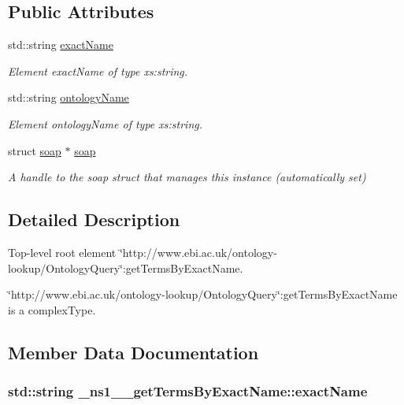 \subsection*{Public Attributes}
\begin{DoxyCompactItemize}
\item 
std::string \hyperlink{class__ns1____getTermsByExactName_aafe1da2d9016fdef9fd1265cf98af660}{exactName}
\begin{DoxyCompactList}\small\item\em Element exactName of type xs:string. \end{DoxyCompactList}\item 
std::string \hyperlink{class__ns1____getTermsByExactName_a18c7a192bfb3aed0166fee7d8bcfbf71}{ontologyName}
\begin{DoxyCompactList}\small\item\em Element ontologyName of type xs:string. \end{DoxyCompactList}\item 
\hypertarget{class__ns1____getTermsByExactName_ae1f8d6e6d8eef1294eac66b63184b45d}{
struct \hyperlink{class__ns1____getTermsByExactName_ae1f8d6e6d8eef1294eac66b63184b45d}{soap} $\ast$ \hyperlink{class__ns1____getTermsByExactName_ae1f8d6e6d8eef1294eac66b63184b45d}{soap}}
\label{class__ns1____getTermsByExactName_ae1f8d6e6d8eef1294eac66b63184b45d}

\begin{DoxyCompactList}\small\item\em A handle to the soap struct that manages this instance (automatically set) \end{DoxyCompactList}\end{DoxyCompactItemize}


\subsection{Detailed Description}
Top-\/level root element \char`\"{}http://www.ebi.ac.uk/ontology-\/lookup/OntologyQuery\char`\"{}:getTermsByExactName. 

\char`\"{}http://www.ebi.ac.uk/ontology-\/lookup/OntologyQuery\char`\"{}:getTermsByExactName is a complexType. 

\subsection{Member Data Documentation}
\hypertarget{class__ns1____getTermsByExactName_aafe1da2d9016fdef9fd1265cf98af660}{
\subsubsection[{exactName}]{\setlength{\rightskip}{0pt plus 5cm}std::string {\bf \_\-ns1\_\-\_\-getTermsByExactName::exactName}}}
\label{class__ns1____getTermsByExactName_aafe1da2d9016fdef9fd1265cf98af660}


